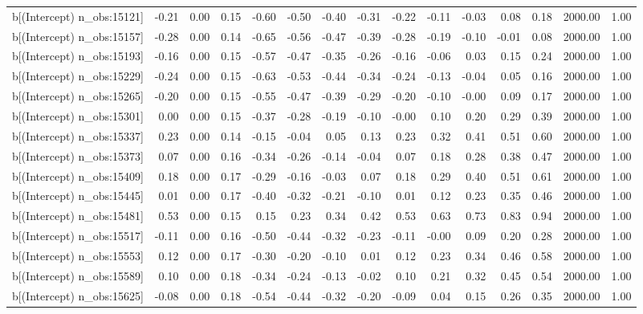 \begin{table}[ht]
\begin{tabular}{rrrrrrrrrrrrrrr}
  b[(Intercept) n\_obs:15121] & -0.21 & 0.00 & 0.15 & -0.60 & -0.50 & -0.40 & -0.31 & -0.22 & -0.11 & -0.03 & 0.08 & 0.18 & 2000.00 & 1.00 \\ 
  b[(Intercept) n\_obs:15157] & -0.28 & 0.00 & 0.14 & -0.65 & -0.56 & -0.47 & -0.39 & -0.28 & -0.19 & -0.10 & -0.01 & 0.08 & 2000.00 & 1.00 \\ 
  b[(Intercept) n\_obs:15193] & -0.16 & 0.00 & 0.15 & -0.57 & -0.47 & -0.35 & -0.26 & -0.16 & -0.06 & 0.03 & 0.15 & 0.24 & 2000.00 & 1.00 \\ 
  b[(Intercept) n\_obs:15229] & -0.24 & 0.00 & 0.15 & -0.63 & -0.53 & -0.44 & -0.34 & -0.24 & -0.13 & -0.04 & 0.05 & 0.16 & 2000.00 & 1.00 \\ 
  b[(Intercept) n\_obs:15265] & -0.20 & 0.00 & 0.15 & -0.55 & -0.47 & -0.39 & -0.29 & -0.20 & -0.10 & -0.00 & 0.09 & 0.17 & 2000.00 & 1.00 \\ 
  b[(Intercept) n\_obs:15301] & 0.00 & 0.00 & 0.15 & -0.37 & -0.28 & -0.19 & -0.10 & -0.00 & 0.10 & 0.20 & 0.29 & 0.39 & 2000.00 & 1.00 \\ 
  b[(Intercept) n\_obs:15337] & 0.23 & 0.00 & 0.14 & -0.15 & -0.04 & 0.05 & 0.13 & 0.23 & 0.32 & 0.41 & 0.51 & 0.60 & 2000.00 & 1.00 \\ 
  b[(Intercept) n\_obs:15373] & 0.07 & 0.00 & 0.16 & -0.34 & -0.26 & -0.14 & -0.04 & 0.07 & 0.18 & 0.28 & 0.38 & 0.47 & 2000.00 & 1.00 \\ 
  b[(Intercept) n\_obs:15409] & 0.18 & 0.00 & 0.17 & -0.29 & -0.16 & -0.03 & 0.07 & 0.18 & 0.29 & 0.40 & 0.51 & 0.61 & 2000.00 & 1.00 \\ 
  b[(Intercept) n\_obs:15445] & 0.01 & 0.00 & 0.17 & -0.40 & -0.32 & -0.21 & -0.10 & 0.01 & 0.12 & 0.23 & 0.35 & 0.46 & 2000.00 & 1.00 \\ 
  b[(Intercept) n\_obs:15481] & 0.53 & 0.00 & 0.15 & 0.15 & 0.23 & 0.34 & 0.42 & 0.53 & 0.63 & 0.73 & 0.83 & 0.94 & 2000.00 & 1.00 \\ 
  b[(Intercept) n\_obs:15517] & -0.11 & 0.00 & 0.16 & -0.50 & -0.44 & -0.32 & -0.23 & -0.11 & -0.00 & 0.09 & 0.20 & 0.28 & 2000.00 & 1.00 \\ 
  b[(Intercept) n\_obs:15553] & 0.12 & 0.00 & 0.17 & -0.30 & -0.20 & -0.10 & 0.01 & 0.12 & 0.23 & 0.34 & 0.46 & 0.58 & 2000.00 & 1.00 \\ 
  b[(Intercept) n\_obs:15589] & 0.10 & 0.00 & 0.18 & -0.34 & -0.24 & -0.13 & -0.02 & 0.10 & 0.21 & 0.32 & 0.45 & 0.54 & 2000.00 & 1.00 \\ 
  b[(Intercept) n\_obs:15625] & -0.08 & 0.00 & 0.18 & -0.54 & -0.44 & -0.32 & -0.20 & -0.09 & 0.04 & 0.15 & 0.26 & 0.35 & 2000.00 & 1.00 \\ 

\end{tabular}
\end{table}
